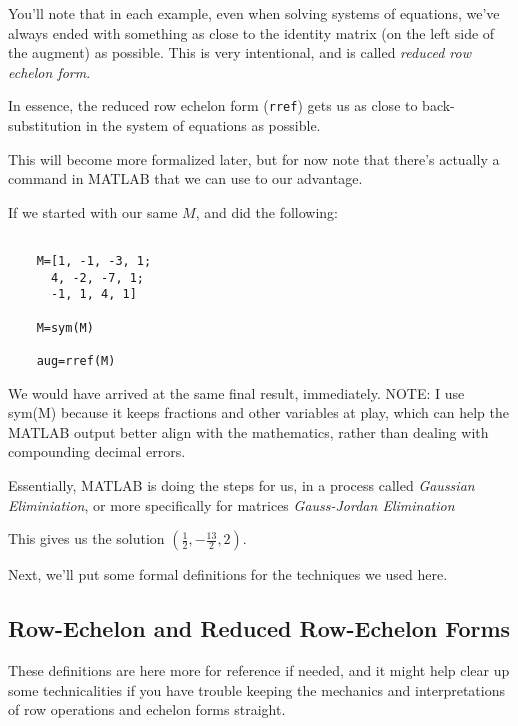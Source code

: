 \documentclass{ximera}
\begin{document}
\begin{exploration}
 
\begin{remark}

  You'll note that in each example, even when solving systems of equations, we've always ended with something as close to the identity matrix (on the left side of the augment) as possible. This is very intentional, and is called \emph{reduced row echelon form}.

  In essence, the reduced row echelon form (\texttt{rref}) gets us as close to back-substitution in the system of equations as possible. 

  This will become more formalized later, but for now note that there's actually a command in MATLAB that we can use to our advantage. 

  If we started with our same $M$, and did the following:

  \begin{verbatim}
  
    M=[1, -1, -3, 1;
      4, -2, -7, 1;
      -1, 1, 4, 1]

    M=sym(M)

    aug=rref(M)

  \end{verbatim}

  We would have arrived at the same final result, immediately. NOTE: I use sym(M) because it keeps fractions and other variables at play, which can help the MATLAB output better align with the mathematics, rather than dealing with compounding decimal errors. 
  
  Essentially, MATLAB is doing the steps for us, in a process called \emph{Gaussian Eliminiation}, or more specifically for matrices \emph{Gauss-Jordan Elimination}

\end{remark}

\end{exploration}


This gives us the solution $(\frac{1}{2}, -\frac{13}{2}, 2)$.

Next, we'll put some formal definitions for the techniques we used here.
 

 
\subsection*{Row-Echelon and Reduced Row-Echelon Forms}

These definitions are here more for reference if needed, and it might help clear up some technicalities if you have trouble keeping the mechanics and interpretations of row operations and echelon forms straight. 
\end{document}
